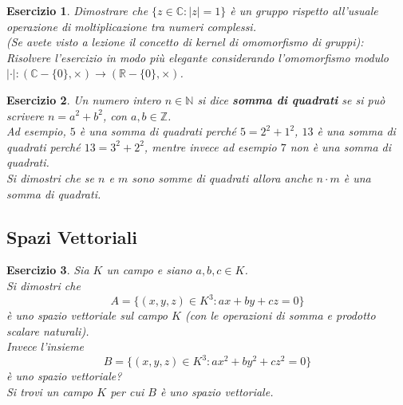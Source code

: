 \documentclass{article}
\newtheorem{es}{Esercizio}
\begin{document}
{\begin{es}
    Dimostrare che $\{z\in \mathbb{C}:|z|=1\}$ è un gruppo rispetto all'usuale operazione di moltiplicazione tra numeri complessi.\\ 
    (Se avete visto a lezione il concetto di kernel di omomorfismo di gruppi): Risolvere l'esercizio in modo più elegante considerando l'omomorfismo modulo $|\cdot|:(\mathbb{C}-\{0\},\times)\to (\mathbb{R}-\{0\},\times)$.
\end{es}



\begin{es}
    Un numero intero $n\in \mathbb{N}$ si dice \textbf{somma di quadrati} se si può scrivere $n=a^2+b^2$, con $a,b\in \mathbb{Z}$.\\
    Ad esempio, $5$ è una somma di quadrati perché $5=2^2+1^2$, $13$ è una somma di quadrati perché $13=3^2+2^2$, mentre invece ad esempio $7$ non è una somma di quadrati.\\
    Si dimostri che se $n$ e $m$ sono somme di quadrati allora anche $n\cdot m$ è una somma di quadrati.
\end{es}




\subsection{Spazi Vettoriali}



\begin{es}
    Sia $K$ un campo e siano $a,b,c\in K$.\\
    Si dimostri che $$A = \{(x,y,z)\in K^3: ax+by+cz=0\}$$
    è uno spazio vettoriale sul campo $K$ (con  le operazioni di somma e prodotto scalare naturali).\\
    Invece l'insieme 
    $$B = \{(x,y,z)\in K^3: ax^2+by^2+cz^2=0\}$$
    è uno spazio vettoriale?\\
    Si trovi un campo $K$ per cui $B$ è uno spazio vettoriale.
    
\end{es}



}
\end{document}
